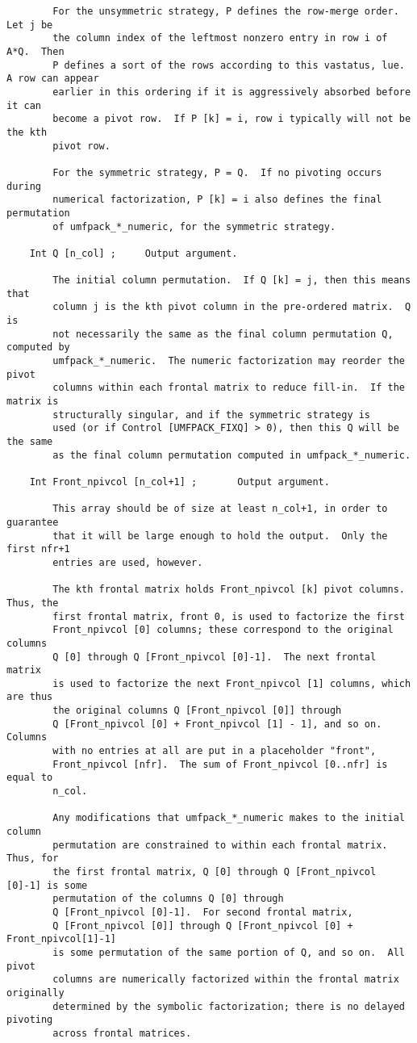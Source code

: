 \documentclass[11pt]{article}
\begin{document}
{\begin{verbatim}
        For the unsymmetric strategy, P defines the row-merge order.  Let j be
        the column index of the leftmost nonzero entry in row i of A*Q.  Then
        P defines a sort of the rows according to this vastatus, lue.  A row can appear
        earlier in this ordering if it is aggressively absorbed before it can
        become a pivot row.  If P [k] = i, row i typically will not be the kth
        pivot row.

        For the symmetric strategy, P = Q.  If no pivoting occurs during
        numerical factorization, P [k] = i also defines the final permutation
        of umfpack_*_numeric, for the symmetric strategy.

    Int Q [n_col] ;     Output argument.

        The initial column permutation.  If Q [k] = j, then this means that
        column j is the kth pivot column in the pre-ordered matrix.  Q is
        not necessarily the same as the final column permutation Q, computed by
        umfpack_*_numeric.  The numeric factorization may reorder the pivot
        columns within each frontal matrix to reduce fill-in.  If the matrix is
        structurally singular, and if the symmetric strategy is
        used (or if Control [UMFPACK_FIXQ] > 0), then this Q will be the same
        as the final column permutation computed in umfpack_*_numeric.

    Int Front_npivcol [n_col+1] ;       Output argument.

        This array should be of size at least n_col+1, in order to guarantee
        that it will be large enough to hold the output.  Only the first nfr+1
        entries are used, however.

        The kth frontal matrix holds Front_npivcol [k] pivot columns.  Thus, the
        first frontal matrix, front 0, is used to factorize the first
        Front_npivcol [0] columns; these correspond to the original columns
        Q [0] through Q [Front_npivcol [0]-1].  The next frontal matrix
        is used to factorize the next Front_npivcol [1] columns, which are thus
        the original columns Q [Front_npivcol [0]] through
        Q [Front_npivcol [0] + Front_npivcol [1] - 1], and so on.  Columns
        with no entries at all are put in a placeholder "front",
        Front_npivcol [nfr].  The sum of Front_npivcol [0..nfr] is equal to
        n_col.

        Any modifications that umfpack_*_numeric makes to the initial column
        permutation are constrained to within each frontal matrix.  Thus, for
        the first frontal matrix, Q [0] through Q [Front_npivcol [0]-1] is some
        permutation of the columns Q [0] through
        Q [Front_npivcol [0]-1].  For second frontal matrix,
        Q [Front_npivcol [0]] through Q [Front_npivcol [0] + Front_npivcol[1]-1]
        is some permutation of the same portion of Q, and so on.  All pivot
        columns are numerically factorized within the frontal matrix originally
        determined by the symbolic factorization; there is no delayed pivoting
        across frontal matrices.


\end{verbatim}}
\end{document}
